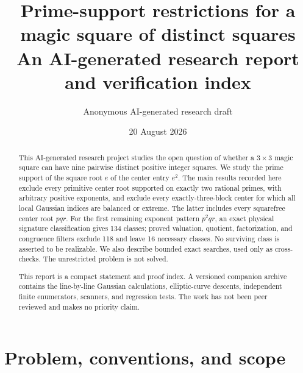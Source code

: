 \documentclass[11pt]{article}
\title{Prime-support restrictions for a magic square of distinct squares\\
\large An AI-generated research report and verification index}
\author{Anonymous AI-generated research draft}
\date{20 August 2026}
\theoremstyle{definition}
\theoremstyle{remark}
\begin{document}
\maketitle

\begin{abstract}
This AI-generated research project studies the open question of whether a
$3\times3$ magic square can have nine pairwise distinct positive integer
squares.  We study the prime support of
the square root $e$ of the center entry $e^2$.  The main results recorded here
exclude every primitive center root supported on exactly two rational primes,
with arbitrary positive exponents, and exclude every exactly-three-block
center for which all local Gaussian indices are balanced or extreme.  The
latter includes every squarefree center root $pqr$.  For the first remaining
exponent pattern $p^2qr$, an exact physical signature classification gives 134
classes; proved valuation, quotient, factorization, and congruence filters
exclude 118 and leave 16 necessary classes.  No surviving class is asserted
to be realizable.  We also describe bounded exact searches, used only as
cross-checks.  The unrestricted problem is not solved.

This report is a compact statement and proof index.  A versioned companion
archive contains the line-by-line Gaussian calculations, elliptic-curve
descents, independent finite enumerators, scanners, and regression tests.
The work has not been peer reviewed and makes no priority claim.
\end{abstract}

\begin{center}
\end{center}

\tableofcontents

\section{Problem, conventions, and scope}
\end{document}

